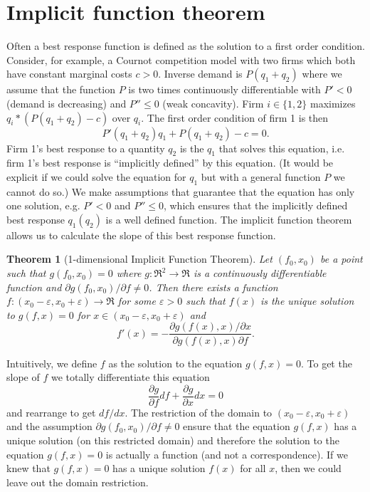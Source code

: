 \documentclass[a4paper,12pt]{article}
\newtheorem{theorem}{Theorem}
\theoremstyle{plain}
\begin{document}
\section{Implicit function theorem}
\label{sec:impl-funct-theor}

Often a best response function is defined as the solution to a first order condition.
Consider, for example, a Cournot competition model with two firms which both have constant marginal costs $c>0$. Inverse demand is $P(q_1+q_2)$ where we assume that the function $P$ is two times continuously differentiable with $P'<0$ (demand is decreasing) and $P''\leq 0$ (weak concavity). Firm $i\in\{1,2\}$ maximizes $q_i*(P(q_1+q_2)-c)$ over $q_i$. The first order condition of firm 1 is then
\begin{equation*}
  P'(q_1+q_2)q_1+P(q_1+q_2)-c=0.
\end{equation*}
Firm 1's best response to a quantity $q_2$ is the $q_1$ that solves this equation, i.e. firm 1's best response is ``implicitly defined'' by this equation. (It would be explicit if we could solve the equation for $q_1$ but with a general function $P$ we cannot do so.) We make assumptions that guarantee that the equation has only one solution, e.g. $P'<0$ and $P''\leq 0$, which ensures that the implicitly defined best response $q_1(q_2)$ is a well defined function. The implicit function theorem allows us to calculate the slope of this best response function.

\begin{theorem}[1-dimensional Implicit Function Theorem]
  Let $(f_0,x_0)$ be a point such that $g(f_0,x_0)=0$ where $g:\Re^2\rightarrow\Re$ is a continuously differentiable function and $\partial g(f_0,x_0)/\partial f\neq 0$. Then there exists a function $f:(x_0-\varepsilon ,x_0+\varepsilon )\rightarrow\Re$ for some $\varepsilon >0$ such that $f(x)$ is the unique solution to $g(f,x)=0$ for $x\in(x_0-\varepsilon ,x_0+\varepsilon )$ and
  \begin{equation*}
    f'(x)=-\frac{\partial g(f(x),x)/\partial x}{\partial g(f(x),x)\partial f}.
  \end{equation*}
\end{theorem}

Intuitively, we define $f$ as the solution to the equation $g(f,x)=0$. To get the slope of $f$ we totally differentiate this equation
\begin{equation*}
  \frac{\partial g}{\partial f}df+\frac{\partial g}{\partial x}dx=0
\end{equation*}
and rearrange to get $df/dx$. The restriction of the domain to $(x_0-\varepsilon, x_0+\varepsilon )$ and the assumption $\partial g(f_0,x_0)/\partial f\neq 0$ ensure that the equation $g(f,x)$ has a unique solution (on this restricted domain) and therefore the solution to the equation $g(f,x)=0$ is  actually  a function (and not a correspondence). If we knew that $g(f,x)=0$ has a unique solution $f(x)$ for all $x$, then we could leave out the domain restriction.
\end{document}
